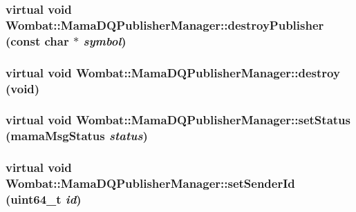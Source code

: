 \label{classWombat_1_1MamaDQPublisherManager_a9ba42534979a3c0e7dce553e2933c2b8}
\hypertarget{classWombat_1_1MamaDQPublisherManager_a7cb1d16699d59c1f368a62c0c0464aa9}{
\subsubsection[{destroyPublisher}]{\setlength{\rightskip}{0pt plus 5cm}virtual void Wombat::MamaDQPublisherManager::destroyPublisher (const char $\ast$ {\em symbol})}}
\label{classWombat_1_1MamaDQPublisherManager_a7cb1d16699d59c1f368a62c0c0464aa9}
\hypertarget{classWombat_1_1MamaDQPublisherManager_a9a3a14de121b17f2dc033355a458b8ef}{
\subsubsection[{destroy}]{\setlength{\rightskip}{0pt plus 5cm}virtual void Wombat::MamaDQPublisherManager::destroy (void)}}
\label{classWombat_1_1MamaDQPublisherManager_a9a3a14de121b17f2dc033355a458b8ef}
\hypertarget{classWombat_1_1MamaDQPublisherManager_acc4aeb1b255c40f4b91fd43033fac47f}{
\subsubsection[{setStatus}]{\setlength{\rightskip}{0pt plus 5cm}virtual void Wombat::MamaDQPublisherManager::setStatus (mamaMsgStatus {\em status})}}
\label{classWombat_1_1MamaDQPublisherManager_acc4aeb1b255c40f4b91fd43033fac47f}
\hypertarget{classWombat_1_1MamaDQPublisherManager_a884251f60c33ff386a816ee9178eceb2}{
\subsubsection[{setSenderId}]{\setlength{\rightskip}{0pt plus 5cm}virtual void Wombat::MamaDQPublisherManager::setSenderId (uint64\_\-t {\em id})}}
